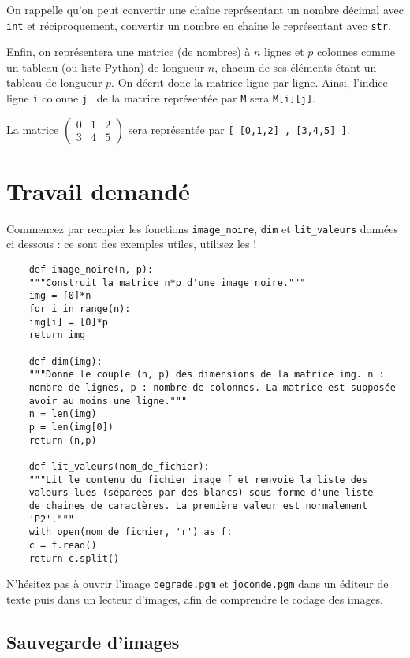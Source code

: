 \bigskip On rappelle qu'on peut convertir une chaîne représentant un nombre
décimal avec \texttt{int} et réciproquement, convertir un nombre en chaîne
le représentant avec \texttt{str}.

\bigskip Enfin, on représentera une matrice (de nombres) à $n$ lignes et $p$ colonnes comme un tableau (ou liste Python) de longueur $n$, chacun de ses éléments étant un tableau de longueur $p$. On décrit donc la matrice ligne par ligne. 
Ainsi, l'indice \og ligne \texttt{i} colonne \texttt{j} \fg\ de la matrice représentée par \texttt{M} sera \texttt{M[i][j]}.
\begin{exemple}
	La matrice $\begin{pmatrix} 0&1&2 \\ 3&4&5 \end{pmatrix}$ sera représentée par \texttt{[ [0,1,2] , [3,4,5] ]}.
\end{exemple}

\eject \section*{Travail demandé}

Commencez par recopier les fonctions  \texttt{image\_noire}, \texttt{dim} et  \texttt{lit\_valeurs} données ci dessous : ce sont des exemples utiles, utilisez les ! 

\begin{lstlisting}
	def image_noire(n, p):
	"""Construit la matrice n*p d'une image noire."""
	img = [0]*n
	for i in range(n):
	img[i] = [0]*p
	return img
	
	def dim(img):
	"""Donne le couple (n, p) des dimensions de la matrice img. n :
	nombre de lignes, p : nombre de colonnes. La matrice est supposée
	avoir au moins une ligne."""
	n = len(img)
	p = len(img[0])
	return (n,p)
	
	def lit_valeurs(nom_de_fichier):
	"""Lit le contenu du fichier image f et renvoie la liste des
	valeurs lues (séparées par des blancs) sous forme d'une liste
	de chaines de caractères. La première valeur est normalement
	'P2'."""
	with open(nom_de_fichier, 'r') as f:
	c = f.read()
	return c.split()
\end{lstlisting}


N'hésitez pas à ouvrir l'image \texttt{degrade.pgm} et \texttt{joconde.pgm} dans un éditeur de texte puis dans un lecteur d'images, afin de comprendre le codage des images.


\subsection*{Sauvegarde d'images}

